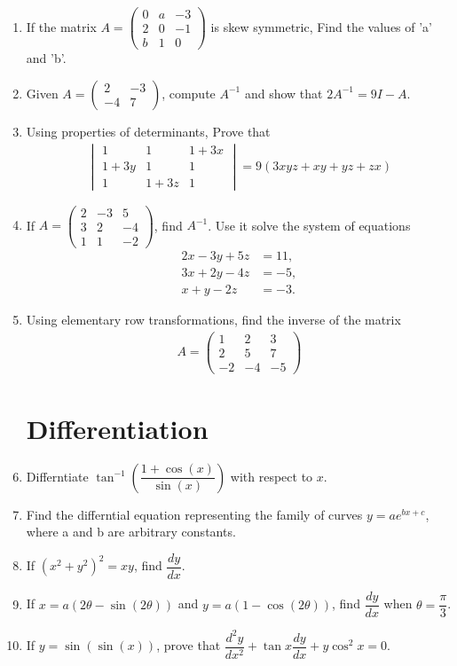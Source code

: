 \documentclass{article}
\newcommand{\myvec}[1]{\ensuremath{\begin{pmatrix}#1\end{pmatrix}}}
\newcommand{\mydet}[1]{\ensuremath{\begin{vmatrix}#1\end{vmatrix}}}
\providecommand{\brak}[1]{\ensuremath{\left(#1\right)}}
\begin{document}
\begin{enumerate}
	\item If the matrix $ A=\myvec{
		0 & a & -3\\
		2 & 0 & -1\\
		b & 1 & 0}$ is skew symmetric, Find the values of 'a' and 'b'.
\item Given $ A = \myvec{
		2 & -3\\
		-4 & 7}$, compute $A^{-1}$ and show that $2A^{-1}=9I - A$.
\item Using properties of determinants, Prove that \begin{align*}
		\mydet{
		1 & 1 & 1+3x \\
		1+3y & 1 & 1 \\
		1 & 1+3z & 1}
	=9\brak{3xyz+xy+yz+zx}
\end{align*}
\item If $A=\myvec{
		2 & -3 & 5 \\
		3 & 2 & -4 \\
		1 & 1 & -2}$, find $ A^{-1}$. Use it solve the system of equations
\begin{align*}
2x-3y+5z&=11,\\3x+2y-4z&=-5,\\x+y-2z&=-3.
\end{align*}
\item Using elementary row transformations, find the inverse of the matrix 
	\begin{align*}  A=\myvec{
		1 & 2 & 3\\
		2 & 5 & 7\\
	       -2 & -4 & -5} 
	\end{align*}

\section{Differentiation}
 
\item Differntiate $\tan^{-1} \brak{\dfrac{1+\cos(x)}{\sin(x)}}$ with respect to  $x$.
\item Find the differntial equation representing the family of curves $y=ae^{bx+c}$, where a and b are arbitrary constants.
\item If $\brak{x^{2}+y^{2}}^{2}=xy$, find $\dfrac{dy}{dx}$.
\item If $x=a\brak{2\theta - \sin \brak{2\theta}}$ and $y=a\brak{1-\cos\brak{2\theta}}$, find $\dfrac{dy}{dx}$
when $\theta = \dfrac{\pi}{3}$.
\item If $y=\sin \brak{\sin \brak{x}}$, prove that $\dfrac{d^{2}y}{dx^{2}}+\tan x \dfrac{dy}{dx}+y\cos^{2}x=0$.	


\end{enumerate}
\end{document}
